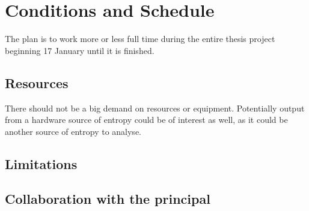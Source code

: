 \documentclass[a4paper,11pt]{report}
\begin{document}
\section*{Conditions and Schedule}
The plan is to work more or less full time during the entire thesis project
beginning 17 January until it is finished.
\subsection*{Resources}
There should not be a big demand on resources or equipment.
Potentially output from a hardware source of entropy could be of interest
as well, as it could be another source of entropy to analyse.
\subsection*{Limitations}
\subsection*{Collaboration with the principal}
\end{document}
